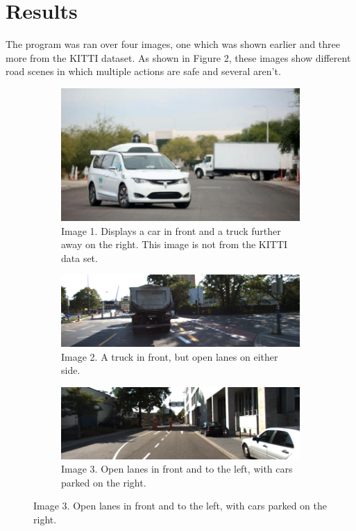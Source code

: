\section{Results}
The program was ran over four images, one which was shown earlier and three more from the KITTI dataset\cite{Fritsch2013ITSC}. As shown in Figure 2, these images show different road scenes in which multiple actions are safe and several aren't.
\begin{figure}[ht]
\begin{subfigure}{.5\textwidth}
  \centering
  \includegraphics[width=.8\linewidth]{cars1.jpg}  
  \caption{Image 1. Displays a car in front and a truck further away on the right. This image is not from the KITTI data set.}
  \label{fig:sub-first}
\end{subfigure}
\begin{subfigure}{.5\textwidth}
  \centering
  \includegraphics[width=.8\linewidth]{umm_000075.png}  
  \caption{Image 2. A truck in front, but open lanes on either side.}
  \label{fig:sub-second}
\end{subfigure}
\begin{subfigure}{.5\textwidth}
  \centering
  \includegraphics[width=.8\linewidth]{umm_000076.png}  
  \caption{Image 3. Open lanes in front and to the left, with cars parked on the right.}

\end{subfigure}
\end{figure}
